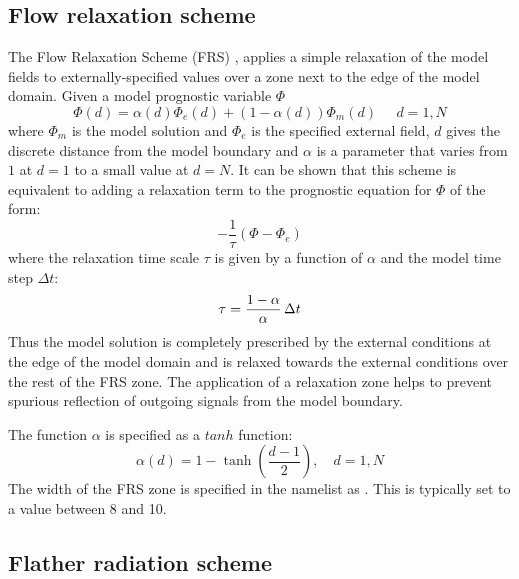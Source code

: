 \documentclass[../main/NEMO_manual]{subfiles}
\begin{document}
\subsection{Flow relaxation scheme}
\label{subsec:BDY_FRS_scheme}

The Flow Relaxation Scheme (FRS) \citep{Davies_QJRMS76,Engerdahl_Tel95},
applies a simple relaxation of the model fields to externally-specified values over
a zone next to the edge of the model domain.
Given a model prognostic variable $\Phi$
\[
  \Phi(d) = \alpha(d)\Phi_{e}(d) + (1-\alpha(d))\Phi_{m}(d)\;\;\;\;\; d=1,N
\]
where $\Phi_{m}$ is the model solution and $\Phi_{e}$ is the specified external field,
$d$ gives the discrete distance from the model boundary and
$\alpha$ is a parameter that varies from $1$ at $d=1$ to a small value at $d=N$.
It can be shown that this scheme is equivalent to adding a relaxation term to
the prognostic equation for $\Phi$ of the form:
\[
  -\frac{1}{\tau}\left(\Phi - \Phi_{e}\right)
\]
where the relaxation time scale $\tau$ is given by a function of $\alpha$ and the model time step $\Delta t$:
\[
  \tau = \frac{1-\alpha}{\alpha}  \,\Delta t
\]
Thus the model solution is completely prescribed by the external conditions at the edge of the model domain and
is relaxed towards the external conditions over the rest of the FRS zone.
The application of a relaxation zone helps to prevent spurious reflection of
outgoing signals from the model boundary. 

The function $\alpha$ is specified as a $tanh$ function:
\[
  \alpha(d) = 1 - \tanh\left(\frac{d-1}{2}\right),       \quad d=1,N
\]
The width of the FRS zone is specified in the namelist as .
This is typically set to a value between 8 and 10.

\subsection{Flather radiation scheme}
\label{subsec:BDY_flather_scheme}
\end{document}
